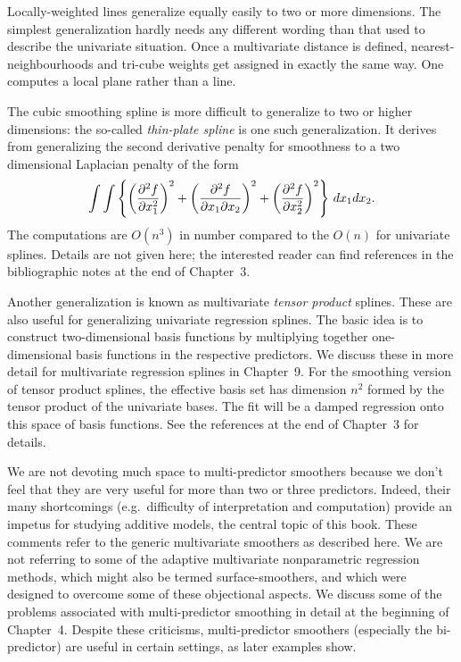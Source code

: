 Locally-weighted lines generalize equally  easily to two or more dimensions.
The simplest generalization hardly needs any different wording than that used to describe the univariate situation. 
Once a multivariate distance is defined,
nearest-neighbourhoods and tri-cube weights get assigned in exactly the same way.
One computes a local plane rather than a line.

%
%
 
The  cubic  smoothing spline is more difficult to generalize to two or higher 
dimensions: the so-called {\sl thin-plate spline} is one such
generalization. 
It derives from generalizing the second derivative penalty for smoothness to a  two dimensional Laplacian penalty of the form 
$$\int\int\left\{\left({\partial^2 f\over \partial x_1^2}\right)^2 +  \left({\partial^2 f\over \partial x_1\partial x_2}\right)^2+\left({\partial^2 f\over \partial x_2^2}\right)^2\right\}\, dx_1dx_2.$$ 
The computations are  $O(n^3)$ in number compared to the $O(n)$ for univariate splines.
%
%
Details are not given here; the interested reader can find references in the
bibliographic notes at the end of Chapter~3.

%
%
Another generalization is known as multivariate {\sl tensor product} splines. 
%
%
These are also useful for generalizing univariate regression splines. 
%
The basic idea is to construct two-dimensional basis functions by multiplying together one-dimensional basis functions in the respective predictors. 
%
We discuss these in more detail for multivariate regression splines in Chapter~9. 
%
For the smoothing version of tensor product splines, the effective basis set has dimension $n^2$ formed by the tensor product of the univariate bases. 
The fit will be a damped regression onto this space of basis functions.
%
See the references at the end of Chapter~3 for  details. 

We are not devoting much space to multi-predictor smoothers because we don't
feel that they are very useful for more than two or three predictors.
Indeed, their many shortcomings (e.g.~difficulty of interpretation and computation)
provide an impetus for studying   additive models, the central
topic of this book.
%
These comments refer to the generic multivariate smoothers as described here. 
%
We are not referring to some of the adaptive multivariate nonparametric regression methods, which might also be termed surface-smoothers, and which were designed to overcome some of these objectional aspects.  
We discuss some of the problems associated with multi-predictor smoothing in detail at the
beginning of Chapter~4.
%
Despite these criticisms,  multi-predictor smoothers  (especially the bi-predictor) are useful
%
%
%
%
%
in certain settings, as later examples  show. 

